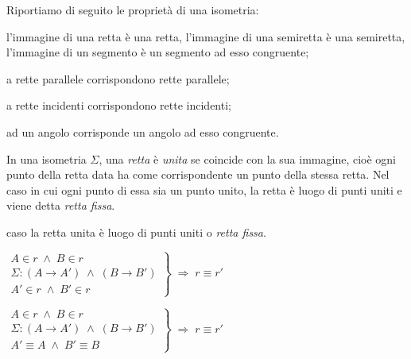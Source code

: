 Riportiamo di seguito le proprietà di una isometria:
\begin{itemize*}
\item l'immagine di una retta è una retta, l'immagine di una 
semiretta è una semiretta, l'immagine di un segmento è un segmento ad 
esso congruente;
\item a rette parallele corrispondono rette parallele;
\item a rette incidenti corrispondono rette incidenti;
\item ad un angolo corrisponde un angolo ad esso congruente.
\end{itemize*}

\begin{definizione}
In una isometria $\Sigma$, una \emph{retta} è \emph{unita} se 
coincide con la sua immagine, cioè ogni punto della retta data ha 
come corrispondente un punto della stessa retta.
Nel caso in cui ogni punto di essa sia un punto unito, la retta è 
luogo di punti uniti e viene detta \emph{retta fissa}.
\end{definizione}

caso la retta unita è luogo di punti uniti o \emph{retta fissa}.

\noindent\begin{minipage}{0.6\textwidth}\parindent15pt
\noindent $\left.\begin{array}{lll} A\in r \;\wedge\; B\in r\\ \Sigma 
: (A\rightarrow A') \;\wedge\; (B\rightarrow B')\\ A'\in r \;\wedge\; 
B'\in r \end{array}\right\} \;\Rightarrow\; r\equiv r'$
\end{minipage}\hfil
\begin{minipage}{0.4\textwidth}
  \centering
\end{minipage}\vspace{8pt}

\noindent\begin{minipage}{0.6\textwidth}\parindent15pt
\noindent $\left.\begin{array}{lll} A\in r \;\wedge\; B\in r\\ \Sigma 
: (A\rightarrow A') \;\wedge\; (B\rightarrow B')\\ A'\equiv A 
\;\wedge\; B'\equiv B \end{array}\right\} \;\Rightarrow\; r\equiv r'$
\end{minipage}\hfil
\begin{minipage}{0.4\textwidth}
  \centering
\end{minipage}


